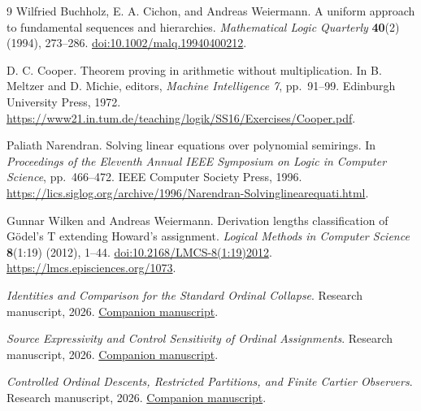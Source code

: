 \begingroup
\small
\begin{thebibliography}{9}
Wilfried Buchholz, E. A. Cichon, and Andreas Weiermann.
A uniform approach to fundamental sequences and hierarchies.
\emph{Mathematical Logic Quarterly} \textbf{40}(2) (1994), 273--286.
\href{https://doi.org/10.1002/malq.19940400212}{doi:10.1002/malq.19940400212}.

D. C. Cooper.
Theorem proving in arithmetic without multiplication.
In B. Meltzer and D. Michie, editors, \emph{Machine Intelligence 7},
pp.~91--99. Edinburgh University Press, 1972.
\url{https://www21.in.tum.de/teaching/logik/SS16/Exercises/Cooper.pdf}.

Paliath Narendran.
Solving linear equations over polynomial semirings.
In \emph{Proceedings of the Eleventh Annual IEEE Symposium on Logic in
Computer Science}, pp.~466--472. IEEE Computer Society Press, 1996.
\url{https://lics.siglog.org/archive/1996/Narendran-Solvinglinearequati.html}.

Gunnar Wilken and Andreas Weiermann.
Derivation lengths classification of G\"odel's T extending Howard's assignment.
\emph{Logical Methods in Computer Science} \textbf{8}(1:19) (2012), 1--44.
\href{https://doi.org/10.2168/LMCS-8(1:19)2012}{doi:10.2168/LMCS-8(1:19)2012}.
\url{https://lmcs.episciences.org/1073}.

\emph{Identities and Comparison for the Standard Ordinal Collapse}.
Research manuscript, 2026.
\href{https://github.com/avg-netizen/logic-lineages-papers/blob/papers/ii5-explanatory-2026-11-17/18-standard-control-comparison/paper.pdf}{Companion manuscript}.

\emph{Source Expressivity and Control Sensitivity of Ordinal Assignments}.
Research manuscript, 2026.
\href{https://github.com/avg-netizen/logic-lineages-papers/blob/papers/ii5-explanatory-2026-11-17/19-source-expressivity-and-control-sensitivity/paper.pdf}{Companion manuscript}.

\emph{Controlled Ordinal Descents, Restricted Partitions, and Finite Cartier Observers}.
Research manuscript, 2026.
\href{https://github.com/avg-netizen/logic-lineages-papers/blob/papers/ii5-explanatory-2026-11-17/20-controlled-descents-and-cartier-observers/paper.pdf}{Companion manuscript}.
\end{thebibliography}
\endgroup
